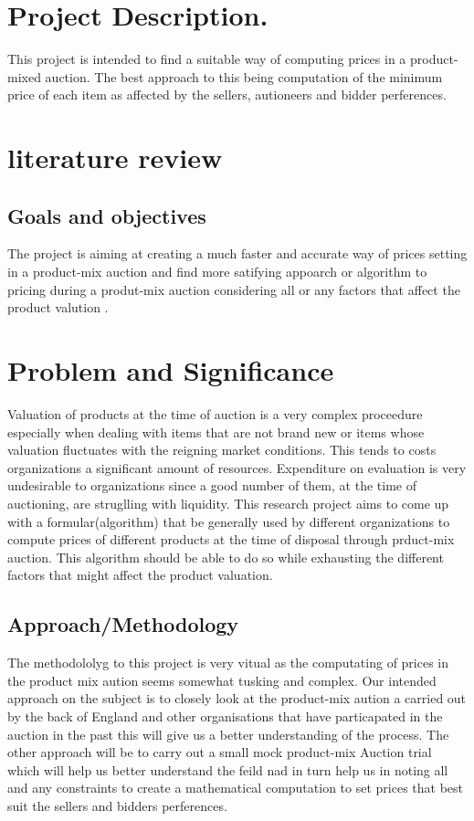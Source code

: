 \documentclass[11pt]{article} %
\begin{document}
\section{Project Description.}
This project is intended to find a  suitable way of computing prices in a product-mixed auction. The best approach to this being computation of the minimum price of each item as affected by the sellers, autioneers and bidder perferences.
\section{literature review}

 \subsection{Goals and objectives} 
 The project is aiming at creating a  much faster and accurate way of prices setting in a product-mix auction and find more satifying appoarch or algorithm to pricing during a produt-mix auction considering all or any factors that affect the product valution .

\section{Problem and Significance}
Valuation of products at the time of auction is a very complex proceedure especially when dealing with items that are not brand new or items whose valuation fluctuates with the reigning market conditions. This tends to costs organizations a significant amount of resources.
Expenditure on evaluation is very undesirable to organizations since a good number of them, at the time of auctioning, are struglling with liquidity.
This research project aims to come up with a formular(algorithm) that be generally used by different organizations to compute prices of different products at the time of disposal through prduct-mix auction. This algorithm should be able to do so while exhausting the different factors that might affect the product valuation.
\subsection{Approach/Methodology} 
The methodololyg to this project is very vitual as the computating of prices in the product mix aution seems somewhat tusking and complex. 
Our intended approach on the subject is to closely look at the product-mix aution a  carried out by the back of England and other organisations that have particapated in the auction in the past this will give us a better understanding of the process. 
The other approach will be to carry out a small mock product-mix Auction trial which will help us better understand the feild nad in turn help us in noting all and any constraints to create a mathematical computation to set prices that best suit the sellers and bidders perferences.
\end{document}
